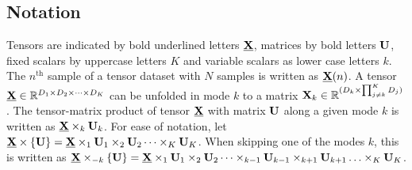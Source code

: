 \documentclass[twocolumn]{article}
\begin{document}
\subsection{Notation}
Tensors are indicated by bold underlined letters $\ten{X}$, matrices by bold
letters $\mat{U}$, fixed scalars by uppercase letters $K$ and variable
scalars as lower case letters $k$.
The $n^\text{th}$ sample of a tensor dataset with $N$ samples is written as
$\ten{X}(n)$.
A tensor $\ten{X}\in \mathbb{R}^{D_1\times D_2 \times \cdots \times D_K}$ can be unfolded in mode
$k$ to a matrix $\mat{X}_k\in\mathbb{R}^{(D_k\times\prod_{j\neq k}^K D_j)}$.
The tensor-matrix product of tensor $\ten{X}$ with matrix $\mat{U}$ along a
given mode $k$ is written as $\ten{X}\mpr{\mat{U}}{k}$. For ease of notation, let
$\ten{X}\mmpr{\mat{U}} =
	\ten{X}\mpr{\mat{U}}{1}\mpr{\mat{U}}{2}\cdots\mpr{\mat{U}}{K}$.
When skipping one of the modes $k$, this is
written as $\ten{X}\mmprs{\mat{U}}{k} =
	\ten{X}\mpr{\mat{U}}{1}\mpr{\mat{U}}{2}\cdots\mpr{\mat{U}}{k-1}\mpr{\mat{U}}{k+1}\ldots\mpr{\mat{U}}{K}$.
\end{document}
